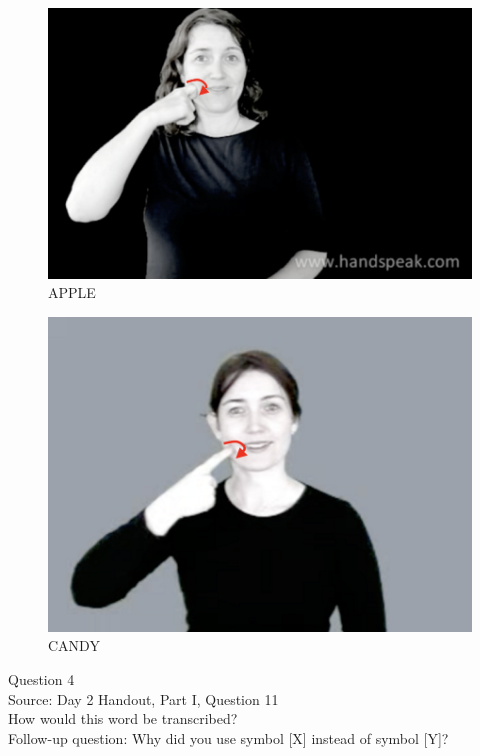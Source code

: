 \documentclass[12pt]{article}
\begin{document}
\begin{figure}[H]
\includegraphics{../images/asl_apple.png}
\caption{APPLE}
\end{figure}
\begin{figure}[H]
\includegraphics{../images/asl_candy.png}
\caption{CANDY}
\end{figure}

\newpage

{\large Question 4}\\

Source: Day 2 Handout, Part I, Question 11\\

How would this word be transcribed?\\ Follow-up question: Why did you use symbol [X] instead of symbol [Y]?\\
\end{document}
